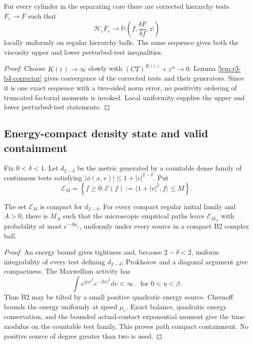 \begin{theorem}
\label{thm:r3-b4-generator}
For every cylinder in the separating core there are corrected hierarchy tests
\(F_\varepsilon\to F\) such that
\[
 \mathscr H_\varepsilon F_\varepsilon
 \longrightarrow
 \mathbb H\left(f,\frac{\delta F}{\delta f},\psi\right)
\]
locally uniformly on regular hierarchy balls.  The same sequence gives both
the viscosity upper and lower perturbed-test inequalities.
\end{theorem}

\begin{proof}
Choose \(K(\varepsilon)\to\infty\) slowly with
\((CT)^{K(\varepsilon)}+\varepsilon^\alpha\to0\).  Lemma
\ref{lem:r3-b4-corrector} gives convergence of the corrected tests and their
generators.  Since it is one exact sequence with a two-sided norm error, no
positivity ordering of truncated factorial moments is invoked.  Local
uniformity supplies the upper and lower perturbed-test statements.
\end{proof}

\subsection{Energy-compact density state and valid containment}

Fix \(0<\delta<1\).  Let \(d_{2-\delta}\) be the metric generated by a
countable dense family of continuous tests satisfying
\(|\phi(x,v)|\le1+|v|^{2-\delta}\).  Put
\[
 \mathcal E_M=
 \left\{f\ge0:\mathcal E(f):=
 \langle1+|v|^2,f\rangle\le M\right\}.
\]

\begin{lemma}
\label{lem:r3-b4-containment}
The set \(\mathcal E_M\) is compact for \(d_{2-\delta}\).  For every compact
regular initial family and \(A>0\), there is \(M_A\) such that the microscopic
empirical paths leave \(\mathcal E_{M_A}\) with probability at most
\(e^{-A\mu_\varepsilon}\), uniformly under every source in a compact B2
complex ball.
\end{lemma}

\begin{proof}
An energy bound gives tightness and, because \(2-\delta<2\), uniform
integrability of every test defining \(d_{2-\delta}\); Prokhorov and a diagonal
argument give compactness.  The Maxwellian activity has
\[
 \int e^{\eta|v|^2}e^{-\beta|v|^2}dv<\infty
 \quad\text{for }0<\eta<\beta.
\]
Thus B2 may be tilted by a small positive quadratic energy source.  Chernoff
bounds the energy uniformly at speed \(\mu_\varepsilon\).  Exact balance,
quadratic energy conservation, and the bounded actual-contact exponential
moment give the time modulus on the countable test family.  This proves path
compact containment.  No positive source of degree greater than two is used.
\end{proof}

